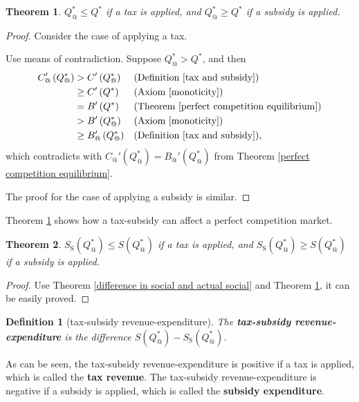 \documentclass{article}
\newtheorem{theorem}{Theorem}[subsection]
\newtheorem{definition}{Definition}[subsection]
\begin{document}
\begin{theorem}
\label{effect of tax and subsidy}
$Q_@^*\le Q^*$ if a tax is applied, and $Q_@^*\ge Q^*$ if a subsidy is applied.
\end{theorem}
\begin{proof}
Consider the case of applying a tax.

Use means of contradiction.
Suppose $Q_@^*>Q^*$, and then
\begin{align*}
C_@'\left(Q_@^*\right)&>C'\left(Q_@^*\right)&&\text{(Definition \ref{tax and subsidy})}\\
&\ge C'\left(Q^*\right)&&\text{(Axiom \ref{monoticity})}\\
&=B'\left(Q^*\right)&&\text{(Theorem \ref{perfect competition equilibrium})}\\\
&>B'\left(Q_@^*\right)&&\text{(Axiom \ref{monoticity})}\\
&\ge B_@'\left(Q_@^*\right)&&\text{(Definition \ref{tax and subsidy})},
\end{align*}
which contradicts with $C_@'\left(Q_@^*\right)=B_@'\left(Q_@^*\right)$ from Theorem \ref{perfect competition equilibrium}.

The proof for the case of applying a subsidy is similar.
\end{proof}

Theorem \ref{effect of tax and subsidy} shows how a tax-subsidy can affect a perfect competition market.

\begin{theorem}
$S_\mathrm S\left(Q_@^*\right)\le S\left(Q_@^*\right)$ if a tax is applied, and $S_\mathrm S\left(Q_@^*\right)\ge S\left(Q_@^*\right)$ if a subsidy is applied.
\end{theorem}
\begin{proof}
Use Theorem \ref{difference in social and actual social} and Theorem \ref{effect of tax and subsidy}, it can be easily proved.
\end{proof}

\begin{definition}[tax-subsidy revenue-expenditure]
The \textbf{tax-subsidy revenue-expenditure} is the difference $S\left(Q_@^*\right)-S_\mathrm S\left(Q_@^*\right)$.
\end{definition}

As can be seen, the tax-subsidy revenue-expenditure is positive if a tax is applied, which is called the \textbf{tax revenue}.
The tax-subsidy revenue-expenditure is negative if a subsidy is applied, which is called the \textbf{subsidy expenditure}.
\end{document}
